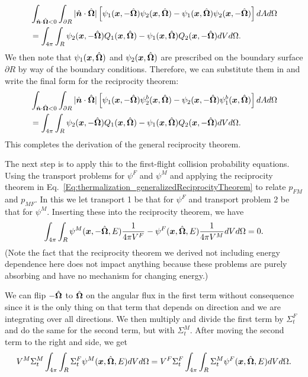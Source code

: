 \begin{align}
  &\int_{\hat{\bm{n}} \cdot \hat{\mathbf{\Omega}} < 0} \int_{\partial R} |\hat{\bm{n}} \cdot \hat{\mathbf{\Omega}}| \left[ \psi_1(\bm{x},-\hat{\mathbf{\Omega}}) \psi_2(\bm{x},\hat{\mathbf{\Omega}}) - \psi_1(\bm{x},\hat{\mathbf{\Omega}}) \psi_2(\bm{x},-\hat{\mathbf{\Omega}}) \right] dA d\Omega  \nonumber \\*
  &= \int_{4\pi} \int_R  \psi_2(\bm{x},-\hat{\mathbf{\Omega}}) Q_1(\bm{x},\hat{\mathbf{\Omega}}) - \psi_1(\bm{x},\hat{\mathbf{\Omega}}) Q_2(\bm{x},-\hat{\mathbf{\Omega}}) dV d\Omega.
\end{align}
We then note that $\psi_1(\bm{x},\hat{\mathbf{\Omega}})$ and $\psi_2(\bm{x},\hat{\mathbf{\Omega}})$ are prescribed on the boundary surface $\partial R$ by way of the boundary conditions. Therefore, we can substitute them in and write the final form for the reciprocity theorem:
\begin{align}  
  &\int_{\hat{\bm{n}} \cdot \hat{\mathbf{\Omega}} < 0} \int_{\partial R} |\hat{\bm{n}} \cdot \hat{\mathbf{\Omega}}| \left[ \psi_1(\bm{x},-\hat{\mathbf{\Omega}}) \psi_2^b(\bm{x},\hat{\mathbf{\Omega}}) -  \psi_2(\bm{x},-\hat{\mathbf{\Omega}}) \psi_1^b(\bm{x},\hat{\mathbf{\Omega}}) \right] dA d\Omega  \nonumber \\*
  &= \int_{4\pi} \int_R  \psi_2(\bm{x},-\hat{\mathbf{\Omega}}) Q_1(\bm{x},\hat{\mathbf{\Omega}}) - \psi_1(\bm{x},\hat{\mathbf{\Omega}}) Q_2(\bm{x},-\hat{\mathbf{\Omega}}) dV d\Omega. \label{Eq:thermalization_generalizedReciprocityTheorem}
\end{align}
This completes the derivation of the general reciprocity theorem.

The next step is to apply this to the first-flight collision probability equations. Using the transport problems for $\psi^F$ and $\psi^M$ and applying the reciprocity theorem in Eq.~\eqref{Eq:thermalization_generalizedReciprocityTheorem} to relate $p_{FM}$ and $p_{MF}$. In this we let transport 1 be that for $\psi^F$ and transport problem 2 be that for $\psi^M$. Inserting these into the reciprocity theorem, we have
\begin{align}
  \int_{4\pi} \int_R  \psi^M(\bm{x},-\hat{\mathbf{\Omega}},E) \frac{1}{4\pi V^F} - \psi^F(\bm{x},\hat{\mathbf{\Omega}},E) \frac{1}{4\pi V^M} dV d\Omega = 0.
\end{align}
(Note the fact that the reciprocity theorem we derived not including energy dependence here does not impact anything because these problems are purely absorbing and have no mechanism for changing energy.) 

We can flip $-\hat{\mathbf{\Omega}}$ to $\hat{\mathbf{\Omega}}$ on the angular flux in the first term without consequence since it is the only thing on that term that depends on direction and we are integrating over all directions. We then multiply and divide the first term by $\Sigma_t^F$ and do the same for the second term, but with $\Sigma_t^M$. After moving the second term to the right and side, we get
\begin{align}
  V^M \Sigma_t^M \int_{4\pi} \int_R \Sigma_t^F \psi^M(\bm{x},\hat{\mathbf{\Omega}},E) dV d\Omega  = V^F \Sigma_t^F \int_{4\pi} \int_R \Sigma_t^M \psi^F(\bm{x},\hat{\mathbf{\Omega}},E)  dV d\Omega .
\end{align}

